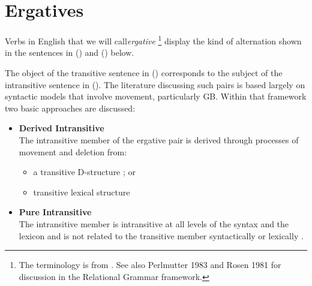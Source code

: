 \chapter{Ergatives}
\label{ergatives}

Verbs in English that we will call{\it ergative} \footnote {The terminology is
from \cite{Burzio86}. See also Perlmutter 1983 and Rosen 1981 for discussion in
the Relational Grammar framework.} display the kind of
alternation shown in the sentences in () and () below.


The object of the transitive sentence in () corresponds to the subject
of the intransitive sentence in (). The literature discussing such pairs
is based largely on syntactic models that involve movement, particularly GB.
Within that framework two basic approaches are discussed:

\begin{itemize}
\item {\bf Derived Intransitive}\\ The intransitive member of the
ergative pair is derived through processes of movement and deletion from:
\begin{itemize}
\item a transitive D-structure \cite{Burzio86}; or	
\item transitive lexical structure \cite{HaleKeyser86,HaleKeyser87}
\end{itemize}

\item {\bf Pure Intransitive}\\ The intransitive member is intransitive at all levels of the
syntax and the lexicon and is not related to the transitive member
syntactically or lexically \cite{Napoli88}.
\end{itemize}

